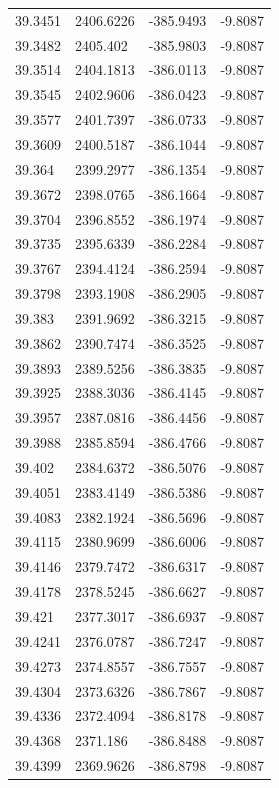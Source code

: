 \begin{table}[H]
\begin{tabular}{llll}
39.3451 & 2406.6226 & -385.9493 & -9.8087 \\
39.3482 & 2405.402 & -385.9803 & -9.8087 \\
39.3514 & 2404.1813 & -386.0113 & -9.8087 \\
39.3545 & 2402.9606 & -386.0423 & -9.8087 \\
39.3577 & 2401.7397 & -386.0733 & -9.8087 \\
39.3609 & 2400.5187 & -386.1044 & -9.8087 \\
39.364 & 2399.2977 & -386.1354 & -9.8087 \\
39.3672 & 2398.0765 & -386.1664 & -9.8087 \\
39.3704 & 2396.8552 & -386.1974 & -9.8087 \\
39.3735 & 2395.6339 & -386.2284 & -9.8087 \\
39.3767 & 2394.4124 & -386.2594 & -9.8087 \\
39.3798 & 2393.1908 & -386.2905 & -9.8087 \\
39.383 & 2391.9692 & -386.3215 & -9.8087 \\
39.3862 & 2390.7474 & -386.3525 & -9.8087 \\
39.3893 & 2389.5256 & -386.3835 & -9.8087 \\
39.3925 & 2388.3036 & -386.4145 & -9.8087 \\
39.3957 & 2387.0816 & -386.4456 & -9.8087 \\
39.3988 & 2385.8594 & -386.4766 & -9.8087 \\
39.402 & 2384.6372 & -386.5076 & -9.8087 \\
39.4051 & 2383.4149 & -386.5386 & -9.8087 \\
39.4083 & 2382.1924 & -386.5696 & -9.8087 \\
39.4115 & 2380.9699 & -386.6006 & -9.8087 \\
39.4146 & 2379.7472 & -386.6317 & -9.8087 \\
39.4178 & 2378.5245 & -386.6627 & -9.8087 \\
39.421 & 2377.3017 & -386.6937 & -9.8087 \\
39.4241 & 2376.0787 & -386.7247 & -9.8087 \\
39.4273 & 2374.8557 & -386.7557 & -9.8087 \\
39.4304 & 2373.6326 & -386.7867 & -9.8087 \\
39.4336 & 2372.4094 & -386.8178 & -9.8087 \\
39.4368 & 2371.186 & -386.8488 & -9.8087 \\
39.4399 & 2369.9626 & -386.8798 & -9.8087 \\

\end{tabular}
\end{table}
